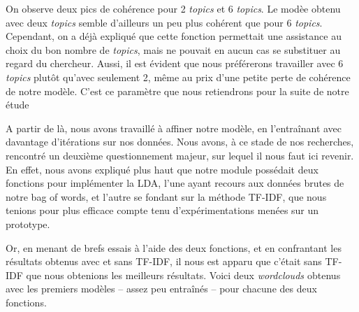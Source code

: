 \documentclass[letterpaper,portrait,12pt]{article}
\begin{document}
\textcolor[rgb]{0.000,0.000,0.000}{	On observe deux pics de coh\'{e}rence pour 2 }\emph{\textcolor[rgb]{0.000,0.000,0.000}{topics}}\textcolor[rgb]{0.000,0.000,0.000}{ et 6 }\emph{\textcolor[rgb]{0.000,0.000,0.000}{topics}}\textcolor[rgb]{0.000,0.000,0.000}{. Le mod\`{e}e obtenu avec deux }\emph{\textcolor[rgb]{0.000,0.000,0.000}{topics}}\textcolor[rgb]{0.000,0.000,0.000}{ semble d'ailleurs un peu plus coh\'{e}rent que pour 6 }\emph{\textcolor[rgb]{0.000,0.000,0.000}{topics}}\textcolor[rgb]{0.000,0.000,0.000}{. Cependant, on a d\'{e}j\`{a} expliqu\'{e} que cette fonction permettait une assistance au choix du bon nombre de }\emph{\textcolor[rgb]{0.000,0.000,0.000}{topics}}\textcolor[rgb]{0.000,0.000,0.000}{, mais ne pouvait en aucun cas se substituer au regard du chercheur. Aussi, il est \'{e}vident que nous pr\'{e}f\'{e}rerons travailler avec 6 }\emph{\textcolor[rgb]{0.000,0.000,0.000}{topics}}\textcolor[rgb]{0.000,0.000,0.000}{ plut\^{o}t qu'avec seulement 2, m\^{e}me au prix d'une petite perte de coh\'{e}rence de notre mod\`{e}le. C'est ce param\`{e}tre que nous retiendrons pour la suite de notre \'{e}tude}





\textcolor[rgb]{0.000,0.000,0.000}{	A partir de l\`{a}, nous avons travaill\'{e} \`{a} affiner notre mod\`{e}le, en l'entra\^{i}nant avec davantage d'it\'{e}rations sur nos donn\'{e}es. Nous avons, \`{a} ce stade de nos recherches, rencontr\'{e} un deuxi\`{e}me questionnement majeur, sur lequel il nous faut ici revenir. En effet, nous avons expliqu\'{e} plus haut que notre module poss\'{e}dait deux fonctions pour impl\'{e}menter la LDA, l'une ayant recours aux donn\'{e}es brutes de notre bag of words, et l'autre se fondant sur la m\'{e}thode TF-IDF, que nous tenions pour plus efficace compte tenu d'exp\'{e}rimentations men\'{e}es sur un prototype.}


\textcolor[rgb]{0.000,0.000,0.000}{	Or, en menant de brefs essais \`{a} l'aide des deux fonctions, et en confrantant les r\'{e}sultats obtenus avec et sans TF-IDF, il nous est apparu que c'\'{e}tait sans TF-IDF que nous obtenions les meilleurs r\'{e}sultats. Voici deux }\emph{\textcolor[rgb]{0.000,0.000,0.000}{wordclouds }}\textcolor[rgb]{0.000,0.000,0.000}{obtenus avec les premiers mod\`{e}les -- assez peu entra\^{i}n\'{e}s -- pour chacune des deux fonctions.}
\end{document}
